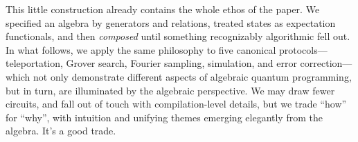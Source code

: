 This little construction already contains the whole ethos of the paper.
We specified an algebra
by generators and relations, treated states as expectation functionals,
and then \emph{composed} until something recognizably algorithmic
fell out.
In what follows, we apply the same philosophy to five canonical
protocols---teleportation, Grover search, Fourier sampling, simulation, and
error correction---which not only demonstrate different aspects of algebraic
quantum programming, but in turn, are illuminated by the algebraic
perspective.
We may draw fewer circuits, and fall out of touch with
compilation-level details, but we trade ``how'' for ``why'', with
intuition and unifying themes emerging elegantly from the algebra. It's
a good trade.
